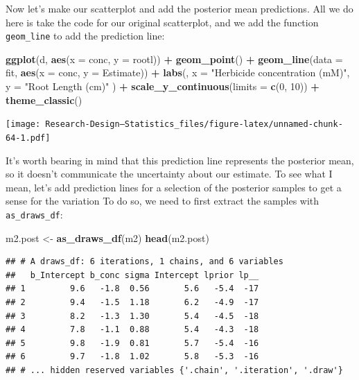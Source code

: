 \documentclass[
]{book}
\newenvironment{Shaded}{\begin{snugshade}}{\end{snugshade}}
\newcommand{\AttributeTok}[1]{\textcolor[rgb]{0.13,0.29,0.53}{#1}}
\newcommand{\DecValTok}[1]{\textcolor[rgb]{0.00,0.00,0.81}{#1}}
\newcommand{\FunctionTok}[1]{\textcolor[rgb]{0.13,0.29,0.53}{\textbf{#1}}}
\newcommand{\NormalTok}[1]{#1}
\newcommand{\OtherTok}[1]{\textcolor[rgb]{0.56,0.35,0.01}{#1}}
\newcommand{\SpecialCharTok}[1]{\textcolor[rgb]{0.81,0.36,0.00}{\textbf{#1}}}
\newcommand{\StringTok}[1]{\textcolor[rgb]{0.31,0.60,0.02}{#1}}
\begin{document}
Now let's make our scatterplot and add the posterior mean predictions. All we do here is take the code for our original scatterplot, and we add the function \texttt{geom\_line} to add the prediction line:

\begin{Shaded}
\begin{Highlighting}[]
\FunctionTok{ggplot}\NormalTok{(d, }\FunctionTok{aes}\NormalTok{(}\AttributeTok{x =}\NormalTok{ conc, }\AttributeTok{y =}\NormalTok{ rootl)) }\SpecialCharTok{+}
  \FunctionTok{geom\_point}\NormalTok{() }\SpecialCharTok{+}
  \FunctionTok{geom\_line}\NormalTok{(}\AttributeTok{data =}\NormalTok{ fit, }\FunctionTok{aes}\NormalTok{(}\AttributeTok{x =}\NormalTok{ conc, }\AttributeTok{y =}\NormalTok{ Estimate)) }\SpecialCharTok{+}
  \FunctionTok{labs}\NormalTok{(,}
    \AttributeTok{x =} \StringTok{"Herbicide concentration (mM)"}\NormalTok{,}
    \AttributeTok{y =} \StringTok{"Root Length (cm)"}
\NormalTok{  ) }\SpecialCharTok{+}
  \FunctionTok{scale\_y\_continuous}\NormalTok{(}\AttributeTok{limits =} \FunctionTok{c}\NormalTok{(}\DecValTok{0}\NormalTok{, }\DecValTok{10}\NormalTok{)) }\SpecialCharTok{+} 
  \FunctionTok{theme\_classic}\NormalTok{()}
\end{Highlighting}
\end{Shaded}

\texttt{[image: Research-Design---Statistics\_files/figure-latex/unnamed-chunk-64-1.pdf]}

It's worth bearing in mind that this prediction line represents the posterior mean, so it doesn't communicate the uncertainty about our estimate. To see what I mean, let's add prediction lines for a selection of the posterior samples to get a sense for the variation To do so, we need to first extract the samples with \texttt{as\_draws\_df}:

\begin{Shaded}
\begin{Highlighting}[]
\NormalTok{m2.post }\OtherTok{\textless{}{-}} \FunctionTok{as\_draws\_df}\NormalTok{(m2)}
\FunctionTok{head}\NormalTok{(m2.post)}
\end{Highlighting}
\end{Shaded}

\begin{verbatim}
## # A draws_df: 6 iterations, 1 chains, and 6 variables
##   b_Intercept b_conc sigma Intercept lprior lp__
## 1         9.6   -1.8  0.56       5.6   -5.4  -17
## 2         9.4   -1.5  1.18       6.2   -4.9  -17
## 3         8.2   -1.3  1.30       5.4   -4.5  -18
## 4         7.8   -1.1  0.88       5.4   -4.3  -18
## 5         9.8   -1.9  0.81       5.7   -5.4  -16
## 6         9.7   -1.8  1.02       5.8   -5.3  -16
## # ... hidden reserved variables {'.chain', '.iteration', '.draw'}
\end{verbatim}
\end{document}
